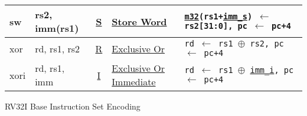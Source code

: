 {\begin{tabular}{|ll|c|l|l|}
\hline
sw    & rs2, imm(rs1) & \hyperref[insnformat:stype]{S} & \hyperref[insn:sw]{Store Word}                  & {\tt \hyperref[memory:m32]{m32}(rs1+\hyperref[imm.s:decode]{imm\_s}) $\leftarrow$ rs2[31:0], pc $\leftarrow$ pc+4}\\
\hline
xor   & rd, rs1, rs2   & \hyperref[insnformat:rtype]{R} & \hyperref[insn:xor]{Exclusive Or}              & {\tt rd $\leftarrow$ rs1 $\oplus$ rs2, pc $\leftarrow$ pc+4}\\
\hline
xori  & rd, rs1, imm  & \hyperref[insnformat:itype]{I} & \hyperref[insn:xori]{Exclusive Or Immediate}    & {\tt rd $\leftarrow$ rs1 $\oplus$ \hyperref[imm.i:decode]{imm\_i}, pc $\leftarrow$ pc+4}\\
\hline
\end{tabular}
}%
\newpage
{\Large RV32I Base Instruction Set Encoding}~\cite[p.~104]{rvismv1v22:2017}

\DrawAllInsnOps
\newpage%
\thispagestyle{empty}%
%

\newpage%
\thispagestyle{empty}%
\restoregeometry
